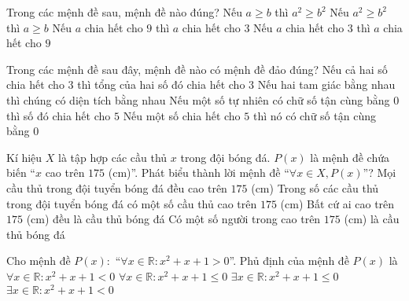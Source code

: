 \begin{ex}%
	Trong các mệnh đề sau, mệnh đề nào đúng?
	\choice
	{Nếu $a\geq b$ thì $a^2\geq b^2$}
	{Nếu $a^2\geq b^2$ thì $a\geq b$  }
	{\True Nếu $a$ chia hết cho $9$ thì $a$ chia hết cho $3$}
	{Nếu $a$ chia hết cho $3$ thì $a$ chia hết cho $9$}
\end{ex}
\begin{ex}%
	Trong các mệnh đề sau đây, mệnh đề nào có mệnh đề đảo đúng?
	\choice
	{Nếu cả hai số chia hết cho $3$ thì tổng của hai số đó chia hết cho $3$}
	{Nếu hai tam giác bằng nhau thì chúng có diện tích bằng nhau}
	{Nếu một số tự nhiên có chữ số tận cùng bằng $0$ thì số đó chia hết cho $5$ }
	{\True Nếu một số chia hết cho $5$ thì nó có chữ số tận cùng bằng $0$}
\end{ex}

\begin{ex}%
	Kí hiệu $X$ là tập hợp các cầu thủ $x$ trong đội bóng đá. $P(x)$ là mệnh đề chứa biến ``$x$ cao trên $175$ (cm)''. Phát biểu thành lời mệnh đề ``$
	\forall x\in X, P(x)$''?
	\choice
	{\True Mọi cầu thủ trong đội tuyển bóng đá đều cao trên $175$ (cm)}
	{Trong số các cầu thủ trong đội tuyển bóng đá có một số cầu thủ cao trên $175$ (cm)}
	{Bất cứ ai cao trên $175$ (cm) đều là cầu thủ bóng đá}
	{Có một số người trong cao trên $175$ (cm) là cầu thủ bóng đá}
\end{ex}

\begin{ex}%
	Cho mệnh đề $P(x)\colon$ ``$\forall x\in\mathbb{R}\colon  x^2+x+1>0$''. Phủ định của mệnh đề $P(x)$ là
	\choice
	{ $\forall x\in\mathbb{R}\colon x^2+x+1<0$}
	{$\forall x\in\mathbb{R}\colon x^2+x+1\leq 0$}
	{\True $\exists x\in\mathbb{R}\colon x^2+x+1\leq 0$}
	{$\exists x\in\mathbb{R}\colon x^2+x+1< 0$}
\end{ex}

